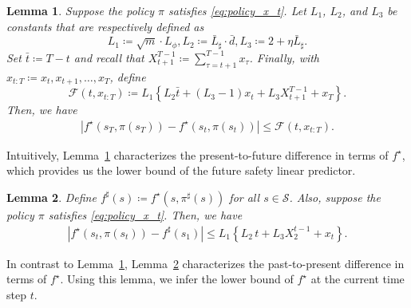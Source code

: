\documentclass[letterpaper]{article} %
\newtheorem{lemma}
{Lemma}
\newcommand{\cS}{\mathcal{S}}
\newcommand{\abs}[1]{\left|{#1}\right|}
\begin{document}
\begin{lemma}
    \label{lemma:f_t_T}
    Suppose the policy $\pi$ satisfies \eqref{eq:policy_x_t}.
    Let $L_1$, $L_2$, and $L_3$ be constants that are respectively defined as
    \[
        L_1 \coloneqq \sqrt{m} \cdot L_\phi, L_2 \coloneqq \bar{L}_\sharp \cdot \bar{d}, L_3 \coloneqq 2 + \eta \bar{L}_\sharp.
    \]
    Set $\bar{t} \coloneqq T - t$ and
    recall that $X_{t+1}^{T-1} \coloneqq \sum_{\tau=t+1}^{T-1} x_\tau$.
    Finally, with $x_{t:T} \coloneqq x_t, x_{t+1}, \ldots, x_T$, define
    \begin{equation*}
        \mathcal{F}(t, x_{t:T}) \coloneqq L_1 \left\{L_2 \bar{t} + (L_3-1) x_t + L_3 X_{t+1}^{T-1} + x_{T} \right\}.
    \end{equation*}
    Then, we have
    \begin{align*}
        \abs{f^\star(s_T, \pi(s_T)) - f^\star(s_t, \pi(s_t))}
        \le \mathcal{F}(t, x_{t:T}).
    \end{align*}
\end{lemma}
%
\noindent
Intuitively, Lemma~\ref{lemma:f_t_T} characterizes the present-to-future difference in terms of $f^\star$, which provides us the lower bound of the future safety linear predictor.
%
\begin{lemma}
    \label{lemma:f_1_t}
    Define $f^\sharp(s) \coloneqq f^\star(s, \pi^\sharp(s))$ for all $s \in \cS$.
    Also, suppose the policy $\pi$ satisfies \eqref{eq:policy_x_t}.
    Then, we have
    \begin{align*}
        \abs{f^\star(s_t, \pi(s_t)) - f^\sharp(s_1)}
        \le L_1 \left\{L_2 \, t + L_3 X_{2}^{t-1} + x_{t} \right\}.
    \end{align*}
\end{lemma}
%
\noindent
In contrast to Lemma~\ref{lemma:f_t_T}, Lemma~\ref{lemma:f_1_t} characterizes the past-to-present difference in terms of $f^\star$.
Using this lemma, we infer the lower bound of $f^\star$ at the current time step $t$.
\end{document}
